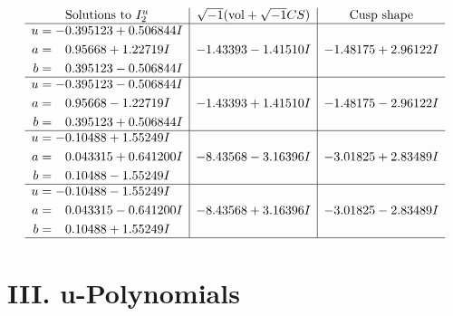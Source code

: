 \documentclass[1p]{elsarticle_modified}
\theoremstyle{definition}
\newcommand{\I}{\sqrt{-1}}
\begin{document}
$$\begin{array}{c|c|c}  
\text{Solutions to }I^u_{2}& \I (\text{vol} + \sqrt{-1}CS) & \text{Cusp shape}\\
 \hline 
\begin{aligned}
u &= -0.395123 + 0.506844 I \\
a &= \phantom{-}0.95668 + 1.22719 I \\
b &= \phantom{-}0.395123 - 0.506844 I\end{aligned}
 & -1.43393 - 1.41510 I & -1.48175 + 2.96122 I \\ \hline\begin{aligned}
u &= -0.395123 - 0.506844 I \\
a &= \phantom{-}0.95668 - 1.22719 I \\
b &= \phantom{-}0.395123 + 0.506844 I\end{aligned}
 & -1.43393 + 1.41510 I & -1.48175 - 2.96122 I \\ \hline\begin{aligned}
u &= -0.10488 + 1.55249 I \\
a &= \phantom{-}0.043315 + 0.641200 I \\
b &= \phantom{-}0.10488 - 1.55249 I\end{aligned}
 & -8.43568 - 3.16396 I & -3.01825 + 2.83489 I \\ \hline\begin{aligned}
u &= -0.10488 - 1.55249 I \\
a &= \phantom{-}0.043315 - 0.641200 I \\
b &= \phantom{-}0.10488 + 1.55249 I\end{aligned}
 & -8.43568 + 3.16396 I & -3.01825 - 2.83489 I\\
 \hline 
 \end{array}$$\newpage
\newpage\renewcommand{\arraystretch}{1}
\centering \section*{ III. u-Polynomials}
\end{document}
